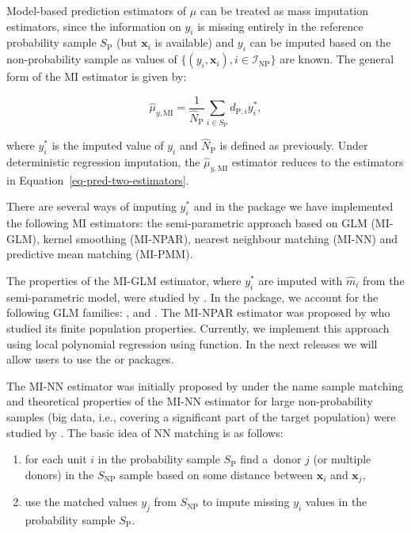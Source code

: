 \documentclass[
]{jss}
\begin{document}
Model-based prediction estimators of \(\mu\) can be treated as mass
imputation estimators, since the information on \(y_i\) is missing
entirely in the reference probability sample \(S_{\text{P}}\) (but
\(\boldsymbol{x}_i\) is available) and \(y_i\) can be imputed based on
the non-probability sample as values of
\(\{ (y_i, \boldsymbol{x}_i), i \in \mathcal{I}_{\text{NP}}\}\) are
known. The general form of the MI estimator is given by:

\begin{equation}
\hat{\mu}_{y,\text{MI}}=\frac{1}{\hat{N}_{\text{P}}} \sum_{i \in S_{\text{P}}} d_{\text{P},i} y_i^*, 
\end{equation}

where \(y_i^*\) is the imputed value of \(y_i\) and
\(\hat{N}_{\text{P}}\) is defined as previously. Under deterministic
regression imputation, the \(\hat{\mu}_{y,\text{MI}}\) estimator reduces
to the estimators in Equation~\ref{eq-pred-two-estimators}.

There are several ways of imputing \(y_i^*\) and in the 
package we have implemented the following MI estimators: the
semi-parametric approach based on GLM (MI-GLM), kernel smoothing
(MI-NPAR), nearest neighbour matching (MI-NN) and predictive mean
matching (MI-PMM).

The properties of the MI-GLM estimator, where \(y_i^*\) are imputed with
\(\hat{m}_i\) from the semi-parametric model, were studied by
\citet{kim_combining_2021}. In the  package, we account
for the following GLM families: ,  and
. The MI-NPAR estimator was proposed by
\citet{chen_nonparametric_2022} who studied its finite population
properties. Currently, we implement this approach using local polynomial
regression using  function. In the next releases we
will allow users to use the  \citep{nppkg} or 
\citep{KernSmooth} packages.

The MI-NN estimator was initially proposed by \citet{rivers2007sampling}
under the name sample matching and theoretical properties of the MI-NN
estimator for large non-probability samples (big data, i.e., covering a
significant part of the target population) were studied by
\citet{yang2021integration}. The basic idea of NN matching is as
follows:

\begin{enumerate}
\item for each unit $i$ in the probability sample $S_{\text{P}}$ find a~donor $j$ (or multiple donors) in the $S_{\text{NP}}$ sample based on some distance between $\boldsymbol{x}_i$ and $\boldsymbol{x}_j$,
\item use the matched values $y_j$ from $S_{\text{NP}}$ to impute missing $y_i$ values in the probability sample $S_{\text{P}}$. 
\end{enumerate}
\end{document}
